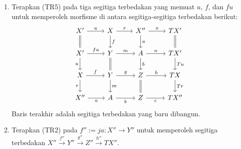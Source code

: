 \begin{bukti}
\begin{enumerate}
		\item Terapkan (TR5) pada tiga segitiga terbedakan yang memuat $u$,
		$f$, dan $fu$ untuk memperoleh morfisme di antara segitiga-segitiga
		terbedakan berikut:
		\begin{equation}\label{eqn:triangulated-9-diag-aux-1}\begin{tikzcd}
			X' \arrow[r, "u"] \arrow[equal, d] & X \arrow[r, "r"] \arrow[d, "f"] & X'' \arrow[r, "o"] \arrow[d, "a"] & TX' \arrow[equal, d] \\
			X' \arrow[r, "fu"] \arrow[d, "u"'] & Y \arrow[r, "m"] \arrow[equal, d] & A \arrow[r, "n"] \arrow[d, "b"] & TX' \arrow[d, "Tu"] \\
			X \arrow[r, "f"] \arrow[d, "r"'] & Y \arrow[r, "g"] \arrow[d, "m"] & Z \arrow[r, "h"] \arrow[equal, d] & TX \arrow[d, "Tr"] \\
			X'' \arrow[r, "a"'] & A \arrow[r, "b"'] & Z \arrow[r, "c"'] & TX''
		\end{tikzcd}\end{equation}
		Baris terakhir adalah segitiga terbedakan yang baru dibangun.

		\item Terapkan (TR2) pada $f'' := ja: X'' \to Y''$ untuk memperoleh
		segitiga terbedakan
		$X'' \xrightarrow{f''} Y'' \xrightarrow{g''} Z''
		\xrightarrow{h''} TX''$.


\end{enumerate}
\end{bukti}
